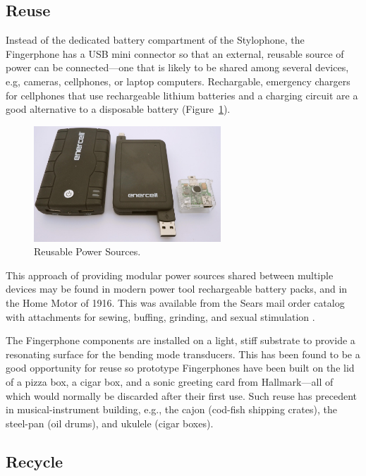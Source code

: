 \subsection{Reuse}

Instead of the dedicated battery compartment of the Stylophone, the Fingerphone
has a USB mini connector so that an external, reusable source of power can be
connected---one that is likely to be shared among several devices, e.g,
cameras, cellphones, or laptop computers. Rechargable, emergency chargers for
cellphones that use rechargeable lithium batteries and a charging circuit are a
good alternative to a disposable battery (Figure~\ref{Freed:img-7}).


\begin{figure}[t]
\centering
\includegraphics[width=70mm]{fig7}
\caption{Reusable Power Sources.}
\label{Freed:img-7}
\end{figure}



This approach of providing modular power sources shared between
multiple devices may be found in modern power tool rechargeable battery packs,
and in the Home Motor of 1916. This was available from the Sears mail order
catalog with attachments for sewing, buffing, grinding, and sexual stimulation
 \cite{Maines:1989}.

The Fingerphone components are installed on a light, stiff
substrate to provide a resonating surface for the bending mode transducers. This
has been found to be a good opportunity for reuse so prototype Fingerphones have
been built on the lid of a pizza box, a cigar box, and a sonic greeting card from
Hallmark---all of which would normally be discarded after their first use. Such
reuse has precedent in musical-instrument building, e.g., the cajon (cod-fish
shipping crates), the steel-pan (oil drums), and ukulele (cigar boxes).

\subsection{Recycle}


